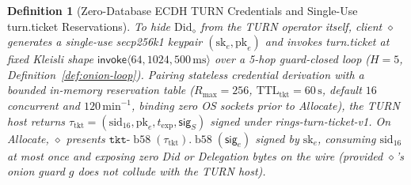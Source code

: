 \documentclass[journal]{IEEEtran}
\newtheorem{definition}{Definition}
\DeclareRobustCommand{\code}[1]{{\ttfamily\renewcommand{\_}{\textunderscore\allowbreak}#1}}
\begin{document}
\begin{definition}[Zero-Database ECDH TURN Credentials and Single-Use \code{turn.ticket} Reservations]
To hide $\mathrm{Did}_\diamond$ from the TURN operator itself, client $\diamond$ generates a single-use secp256k1 keypair $(\mathrm{sk}_e,\mathrm{pk}_e)$ and invokes \code{turn.ticket} at fixed Kleisli shape $\mathsf{invoke}\langle 64,1024,500\,\mathrm{ms}\rangle$ over a 5-hop guard-closed loop ($H=5$, Definition~\ref{def:onion-loop}). Pairing stateless credential derivation with a bounded in-memory reservation table ($R_{\max}=256$, $\mathrm{TTL}_{\mathrm{tkt}}=60\,\mathrm{s}$, default $16$ concurrent and $120\,\mathrm{min}^{-1}$, binding zero OS sockets prior to \code{Allocate}), the TURN host returns $\tau_{\mathrm{tkt}}=(\mathrm{sid}_{16},\mathrm{pk}_e,t_{\exp},\mathsf{sig}_S)$ signed under \code{rings-turn-ticket-v1}. On \code{Allocate}, $\diamond$ presents $\mathtt{tkt\mbox{-}}\operatorname{b58}(\tau_{\mathrm{tkt}})\mathtt{.}\operatorname{b58}(\mathsf{sig}_e)$ signed by $\mathrm{sk}_e$, consuming $\mathrm{sid}_{16}$ at most once and exposing zero \code{Did} or \code{Delegation} bytes on the wire (provided $\diamond$'s onion guard $g$ does not collude with the TURN host).
\end{definition}
\end{document}
